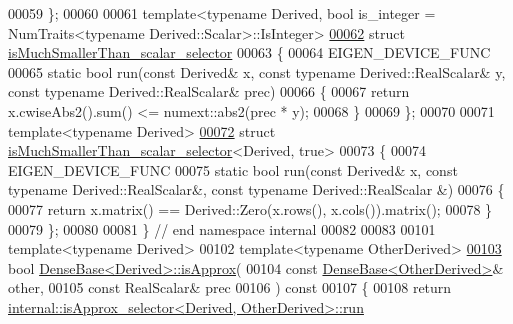 \begin{DoxyCode}
00059 \};
00060 
00061 template<typename Derived, bool is\_integer = NumTraits<typename Derived::Scalar>::IsInteger>
\hyperlink{struct_eigen_1_1internal_1_1is_much_smaller_than__scalar__selector}{00062} \textcolor{keyword}{struct }\hyperlink{struct_eigen_1_1internal_1_1is_much_smaller_than__scalar__selector}{isMuchSmallerThan\_scalar\_selector}
00063 \{
00064   EIGEN\_DEVICE\_FUNC
00065   \textcolor{keyword}{static} \textcolor{keywordtype}{bool} run(\textcolor{keyword}{const} Derived& x, \textcolor{keyword}{const} \textcolor{keyword}{typename} Derived::RealScalar& y, \textcolor{keyword}{const} \textcolor{keyword}{typename} 
      Derived::RealScalar& prec)
00066   \{
00067     \textcolor{keywordflow}{return} x.cwiseAbs2().sum() <= numext::abs2(prec * y);
00068   \}
00069 \};
00070 
00071 \textcolor{keyword}{template}<\textcolor{keyword}{typename} Derived>
\hyperlink{struct_eigen_1_1internal_1_1is_much_smaller_than__scalar__selector_3_01_derived_00_01true_01_4}{00072} \textcolor{keyword}{struct }\hyperlink{struct_eigen_1_1internal_1_1is_much_smaller_than__scalar__selector}{isMuchSmallerThan\_scalar\_selector}<Derived, true>
00073 \{
00074   EIGEN\_DEVICE\_FUNC
00075   \textcolor{keyword}{static} \textcolor{keywordtype}{bool} run(\textcolor{keyword}{const} Derived& x, \textcolor{keyword}{const} \textcolor{keyword}{typename} Derived::RealScalar&, \textcolor{keyword}{const} \textcolor{keyword}{typename} Derived::RealScalar
      &)
00076   \{
00077     \textcolor{keywordflow}{return} x.matrix() == Derived::Zero(x.rows(), x.cols()).matrix();
00078   \}
00079 \};
00080 
00081 \} \textcolor{comment}{// end namespace internal}
00082 
00083 
00101 \textcolor{keyword}{template}<\textcolor{keyword}{typename} Derived>
00102 \textcolor{keyword}{template}<\textcolor{keyword}{typename} OtherDerived>
\hyperlink{group___core___module_a8848223bc635c9c10e7cc68ae343ad81}{00103} \textcolor{keywordtype}{bool} \hyperlink{group___core___module_class_eigen_1_1_dense_base}{DenseBase<Derived>::isApprox}(
00104   \textcolor{keyword}{const} \hyperlink{group___core___module_class_eigen_1_1_dense_base}{DenseBase<OtherDerived>}& other,
00105   \textcolor{keyword}{const} RealScalar& prec
00106 )\textcolor{keyword}{ const}
00107 \textcolor{keyword}{}\{
00108   \textcolor{keywordflow}{return} \hyperlink{struct_eigen_1_1internal_1_1is_approx__selector}{internal::isApprox\_selector<Derived, OtherDerived>::run}

\end{DoxyCode}
